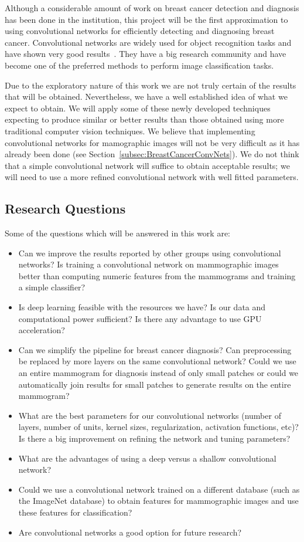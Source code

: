 Although a considerable amount of work on breast cancer detection and diagnosis has been done in the institution, this project will be the first approximation to using convolutional networks for efficiently detecting and diagnosing breast cancer. Convolutional networks are widely used for object recognition tasks and have shown very good results~\cite{Russakovsky2014, Taigman2014, Dieleman2015}. They have a big research community and have become one of the preferred methods to perform image classification tasks.%

Due to the exploratory nature of this work we are not truly certain of the results that will be obtained. Nevertheless, we have a well established idea of what we expect to obtain. We will apply some of these newly developed techniques expecting to produce similar or better results than those obtained using more traditional computer vision techniques. We believe that implementing convolutional networks for mamographic images will not be very difficult as it has already been done (see Section~\ref{subsec:BreastCancerConvNets}). We do not think that a simple convolutional network will suffice to obtain acceptable results; we will need to use a more refined convolutional network with well fitted parameters.

\subsection{Research Questions}
Some of the questions which will be answered in this work are:
\begin{itemize} 
	\item Can we improve the results reported by other groups using convolutional networks? Is training a convolutional network on mammographic images better than computing numeric features from the mammograms and training a simple classifier?
	\item Is deep learning feasible with the resources we have? Is our data and computational power sufficient? Is there any advantage to use GPU acceleration?
	\item Can we simplify the pipeline for breast cancer diagnosis? Can preprocessing be replaced by more layers on the same convolutional network? Could we use an entire mammogram for diagnosis instead of only small patches or could we automatically join results for small patches to generate results on the entire mammogram?
	\item What are the best parameters for our convolutional networks (number of layers, number of units, kernel sizes, regularization, activation functions, etc)? Is there a big improvement on refining the network and tuning parameters?
	\item What are the advantages of using a deep versus a shallow convolutional network? 
	\item Could we use a convolutional network trained on a different database (such as the ImageNet database) to obtain features for mammographic images and use these features for classification?
	\item Are convolutional networks a good option for future research?
\end{itemize}

